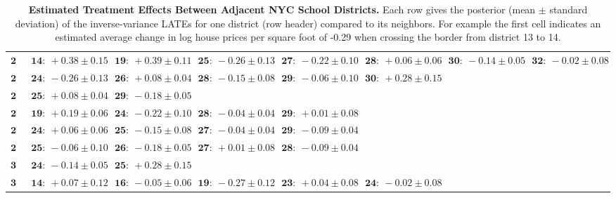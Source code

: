 \begin{landscape}
\begin{table}[p]
\begin{tabular}{r|lllllll}
\( \mathbf{24} \)& \( \mathbf{14:}~+0.38 \pm 0.15 \)& \( \mathbf{19:}~+0.39 \pm 0.11 \)& \( \mathbf{25:}~-0.26 \pm 0.13 \)& \( \mathbf{27:}~-0.22 \pm 0.10 \)& \( \mathbf{28:}~+0.06 \pm 0.06 \)& \( \mathbf{30:}~-0.14 \pm 0.05 \)& \( \mathbf{32:}~-0.02 \pm 0.08 \)\\ 
\( \mathbf{25} \)& \( \mathbf{24:}~-0.26 \pm 0.13 \)& \( \mathbf{26:}~+0.08 \pm 0.04 \)& \( \mathbf{28:}~-0.15 \pm 0.08 \)& \( \mathbf{29:}~-0.06 \pm 0.10 \)& \( \mathbf{30:}~+0.28 \pm 0.15 \)\\ 
\( \mathbf{26} \)& \( \mathbf{25:}~+0.08 \pm 0.04 \)& \( \mathbf{29:}~-0.18 \pm 0.05 \)\\ 
\( \mathbf{27} \)& \( \mathbf{19:}~+0.19 \pm 0.06 \)& \( \mathbf{24:}~-0.22 \pm 0.10 \)& \( \mathbf{28:}~-0.04 \pm 0.04 \)& \( \mathbf{29:}~+0.01 \pm 0.08 \)\\ 
\( \mathbf{28} \)& \( \mathbf{24:}~+0.06 \pm 0.06 \)& \( \mathbf{25:}~-0.15 \pm 0.08 \)& \( \mathbf{27:}~-0.04 \pm 0.04 \)& \( \mathbf{29:}~-0.09 \pm 0.04 \)\\ 
\( \mathbf{29} \)& \( \mathbf{25:}~-0.06 \pm 0.10 \)& \( \mathbf{26:}~-0.18 \pm 0.05 \)& \( \mathbf{27:}~+0.01 \pm 0.08 \)& \( \mathbf{28:}~-0.09 \pm 0.04 \)\\ 
\( \mathbf{30} \)& \( \mathbf{24:}~-0.14 \pm 0.05 \)& \( \mathbf{25:}~+0.28 \pm 0.15 \)\\ 
\( \mathbf{32} \)& \( \mathbf{14:}~+0.07 \pm 0.12 \)& \( \mathbf{16:}~-0.05 \pm 0.06 \)& \( \mathbf{19:}~-0.27 \pm 0.12 \)& \( \mathbf{23:}~+0.04 \pm 0.08 \)& \( \mathbf{24:}~-0.02 \pm 0.08 \)\\ 
            \hline
        \end{tabular}
        \caption{
            \label{table:NYC_pairwise}
            \textbf{Estimated Treatment Effects Between Adjacent NYC School Districts.}
            Each row gives the posterior (mean \(\pm\) standard deviation) of the inverse-variance LATEs for one district (row header) compared to its neighbors.
            For example the first cell indicates an estimated average change in log house prices per square foot of -0.29 when crossing the border from district 13 to 14.
        }
    \end{table}
\end{landscape}
\restoregeometry

